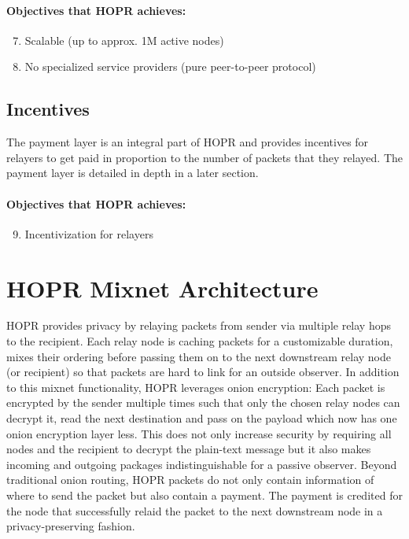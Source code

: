 \documentclass{article}
\begin{document}
\paragraph{Objectives that HOPR achieves:}

\begin{enumerate}\setcounter{enumi}{6}
    \item Scalable (up to approx. 1M active nodes)
    \item No specialized service providers (pure peer-to-peer protocol)
\end{enumerate}

\subsection{Incentives}
The payment layer is an integral part of HOPR and provides incentives for relayers to get paid in proportion to the number of packets that they relayed. The payment layer is detailed in depth in a later section.

\paragraph{Objectives that HOPR achieves:}

\begin{enumerate}\setcounter{enumi}{8}
    \item Incentivization for relayers
\end{enumerate}

\section{HOPR Mixnet Architecture}
HOPR provides privacy by relaying packets from sender via multiple relay hops to the recipient. Each relay node is caching packets for a customizable duration, mixes their ordering before passing them on to the next downstream relay node (or recipient) so that packets are hard to link for an outside observer. In addition to this mixnet functionality, HOPR leverages onion encryption: Each packet is encrypted by the sender multiple times such that only the chosen relay nodes can decrypt it, read the next destination and pass on the payload which now has one onion encryption layer less. This does not only increase security by requiring all nodes and the recipient to decrypt the plain-text message but it also makes incoming and outgoing packages indistinguishable for a passive observer. Beyond traditional onion routing, HOPR packets do not only contain information of where to send the packet but also contain a payment. The payment is credited for the node that successfully relaid the packet to the next downstream node in a privacy-preserving fashion.
\end{document}
